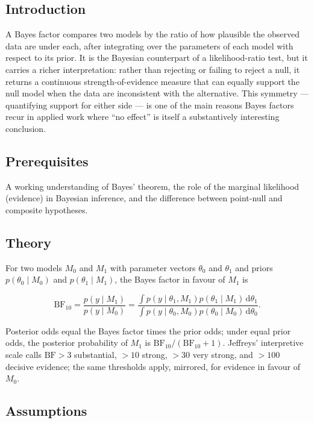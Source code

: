 \documentclass[
]{article}
\author{}
\date{\vspace{-2.5em}}
\begin{document}
\subsection{Introduction}\label{introduction}

A Bayes factor compares two models by the ratio of how plausible the
observed data are under each, after integrating over the parameters of
each model with respect to its prior. It is the Bayesian counterpart of
a likelihood-ratio test, but it carries a richer interpretation: rather
than rejecting or failing to reject a null, it returns a continuous
strength-of-evidence measure that can equally support the null model
when the data are inconsistent with the alternative. This symmetry ---
quantifying support for either side --- is one of the main reasons Bayes
factors recur in applied work where ``no effect'' is itself a
substantively interesting conclusion.

\subsection{Prerequisites}\label{prerequisites}

A working understanding of Bayes' theorem, the role of the marginal
likelihood (evidence) in Bayesian inference, and the difference between
point-null and composite hypotheses.

\subsection{Theory}\label{theory}

For two models \(M_0\) and \(M_1\) with parameter vectors \(\theta_0\)
and \(\theta_1\) and priors \(p(\theta_0 \mid M_0)\) and
\(p(\theta_1 \mid M_1)\), the Bayes factor in favour of \(M_1\) is

\[\mathrm{BF}_{10} = \frac{p(y \mid M_1)}{p(y \mid M_0)} = \frac{\int p(y \mid \theta_1, M_1) p(\theta_1 \mid M_1) \, \mathrm d \theta_1}{\int p(y \mid \theta_0, M_0) p(\theta_0 \mid M_0) \, \mathrm d \theta_0}.\]

Posterior odds equal the Bayes factor times the prior odds; under equal
prior odds, the posterior probability of \(M_1\) is
\(\mathrm{BF}_{10} / (\mathrm{BF}_{10} + 1)\). Jeffreys' interpretive
scale calls \(\mathrm{BF} > 3\) substantial, \(> 10\) strong, \(> 30\)
very strong, and \(> 100\) decisive evidence; the same thresholds apply,
mirrored, for evidence in favour of \(M_0\).

\subsection{Assumptions}\label{assumptions}
\end{document}
